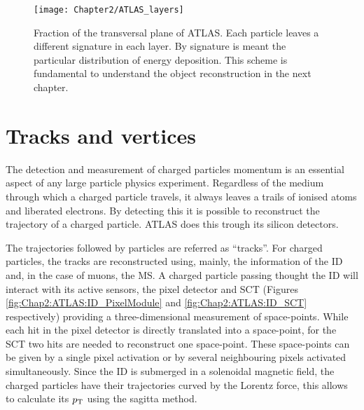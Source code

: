 
\begin{figure}
	\centering
 	 \texttt{[image: Chapter2/ATLAS\_layers]}
	 \caption{Fraction of the transversal plane of ATLAS. Each particle leaves a different signature in each layer. By signature is meant the particular
	 distribution of energy deposition. This scheme is fundamental to understand the object reconstruction in the next chapter. }
	\label{fig:Chap2:ATLAS:ATLAS_Layers}
\end{figure}

\section{Tracks and vertices} %
\label{sec:Chap3:Reco:Tracking}
The detection and measurement of charged particles momentum is an essential aspect of any large particle physics
experiment. Regardless of the medium through which a charged particle travels, it always leaves a trails
of ionised atoms and liberated electrons. By detecting this it is possible to reconstruct the trajectory of a charged
particle. ATLAS does this trough its silicon detectors.

The trajectories followed by particles are referred as ``tracks''. For charged particles, the tracks are reconstructed
using, mainly, the information of the ID and, in the case of muons, the MS.
 A charged particle passing thought the ID will interact with its active sensors, the pixel detector and SCT
 (Figures \ref{fig:Chap2:ATLAS:ID_PixelModule}  and \ref{fig:Chap2:ATLAS:ID_SCT} respectively)
 providing a three-dimensional measurement of space-points.  
 While each hit in the pixel detector is directly translated into a space-point, for the SCT
 two hits are needed to reconstruct one space-point. %
These space-points can be given by a single pixel activation or 
by several neighbouring pixels activated simultaneously. 
Since the ID is submerged in a solenoidal magnetic field, the charged particles have their trajectories curved
by the Lorentz force, this allows to calculate its $p_{\text{T}}$  using the sagitta method.

